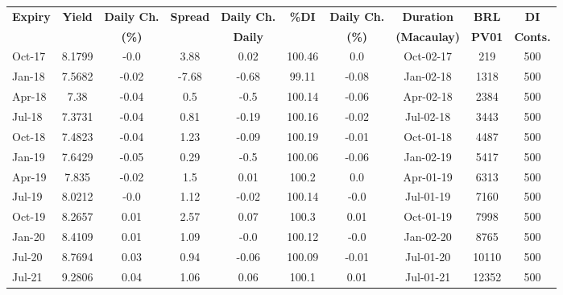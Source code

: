 \documentclass[article,crop=false]{standalone}%
\begin{document}
%
\normalsize%
\setlength{\tabcolsep}{0.15cm}%
\begin{tabular}[h]{l|c c|c c|c c|c c c}%
\hline%
\rowcolor{white}%
\textbf{Expiry}&\textbf{Yield}&\textbf{Daily Ch.}&\textbf{Spread}&\textbf{Daily Ch.}&\textbf{\%DI}&\textbf{Daily Ch.}&\textbf{Duration}&\textbf{BRL}&\textbf{DI}\\%
\rowcolor{white}%
\textbf{}&\textbf{}&\textbf{(\%)}&\textbf{}&\textbf{Daily}&\textbf{}&\textbf{(\%)}&\textbf{(Macaulay)}&\textbf{PV01}&\textbf{Conts.}\\%
\hline%
\rowcolor{lightgray}%
Oct{-}17&8.1799&{-}0.0&3.88&0.02&100.46&0.0&Oct{-}02{-}17&219&500\\%
\rowcolor{white}%
Jan{-}18&7.5682&{-}0.02&{-}7.68&{-}0.68&99.11&{-}0.08&Jan{-}02{-}18&1318&500\\%
\rowcolor{lightgray}%
Apr{-}18&7.38&{-}0.04&0.5&{-}0.5&100.14&{-}0.06&Apr{-}02{-}18&2384&500\\%
\rowcolor{white}%
Jul{-}18&7.3731&{-}0.04&0.81&{-}0.19&100.16&{-}0.02&Jul{-}02{-}18&3443&500\\%
\rowcolor{lightgray}%
Oct{-}18&7.4823&{-}0.04&1.23&{-}0.09&100.19&{-}0.01&Oct{-}01{-}18&4487&500\\%
\rowcolor{white}%
Jan{-}19&7.6429&{-}0.05&0.29&{-}0.5&100.06&{-}0.06&Jan{-}02{-}19&5417&500\\%
\rowcolor{lightgray}%
Apr{-}19&7.835&{-}0.02&1.5&0.01&100.2&0.0&Apr{-}01{-}19&6313&500\\%
\rowcolor{white}%
Jul{-}19&8.0212&{-}0.0&1.12&{-}0.02&100.14&{-}0.0&Jul{-}01{-}19&7160&500\\%
\rowcolor{lightgray}%
Oct{-}19&8.2657&0.01&2.57&0.07&100.3&0.01&Oct{-}01{-}19&7998&500\\%
\rowcolor{white}%
Jan{-}20&8.4109&0.01&1.09&{-}0.0&100.12&{-}0.0&Jan{-}02{-}20&8765&500\\%
\rowcolor{lightgray}%
Jul{-}20&8.7694&0.03&0.94&{-}0.06&100.09&{-}0.01&Jul{-}01{-}20&10110&500\\%
\rowcolor{white}%
Jul{-}21&9.2806&0.04&1.06&0.06&100.1&0.01&Jul{-}01{-}21&12352&500\\%
\hline%
\end{tabular}%
\end{document}

